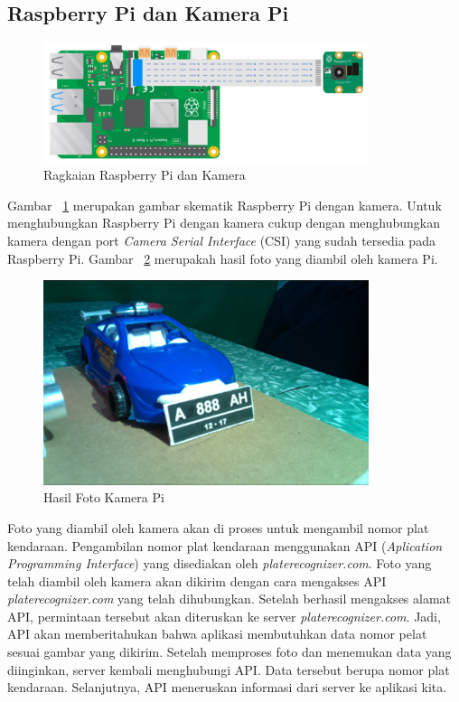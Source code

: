\subsection{Raspberry Pi dan Kamera Pi}
\begin{figure} [H]
    \includegraphics[width=0.85\textwidth, center]{images/skematik-kamera.png}
    \caption{Ragkaian Raspberry Pi dan Kamera}
    \label{fig:skematikKamera}
\end{figure}

Gambar ~\ref{fig:skematikKamera} merupakan gambar skematik Raspberry Pi dengan kamera. Untuk menghubungkan Raspberry Pi dengan kamera cukup dengan menghubungkan kamera dengan port \textit{Camera Serial Interface} (CSI) yang sudah tersedia pada Raspberry Pi. Gambar ~\ref{fig:GambarKameraPi} merupakah hasil foto yang diambil oleh kamera Pi.

\begin{figure} [H]
    \includegraphics[width=0.85\textwidth, center]{images/Hasil Gambar Kamera Pi.png}
    \caption{Hasil Foto Kamera Pi}
    \label{fig:GambarKameraPi}
\end{figure}

Foto yang diambil oleh kamera akan di proses untuk mengambil nomor plat kendaraan. Pengambilan nomor plat kendaraan menggunakan API (\textit{Aplication Programming Interface}) yang disediakan oleh \textit{platerecognizer.com}. Foto yang telah diambil oleh kamera akan dikirim dengan cara mengakses API \textit{platerecognizer.com} yang telah dihubungkan. Setelah berhasil mengakses alamat API, permintaan tersebut akan diteruskan ke server \textit{platerecognizer.com}. Jadi, API akan memberitahukan bahwa aplikasi membutuhkan data nomor pelat sesuai gambar yang dikirim. Setelah memproses foto dan menemukan data yang diinginkan, server kembali menghubungi API. Data tersebut berupa nomor plat kendaraan. Selanjutnya, API meneruskan informasi dari server ke aplikasi kita.

